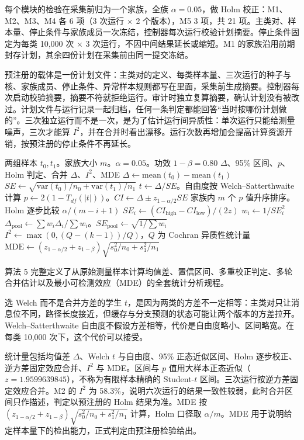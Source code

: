 每个模块的检验在采集前归为一个家族，全族 $\alpha=0.05$，做 Holm 校正：M1、M2、M3、M4 各 6 项（3 次运行 × 2 个版本），M5 3 项，共 21 项。主类对、样本量、停止条件与家族成员一次冻结，控制器每次运行校验计划摘要。停止条件固定为每类 10,000 次 × 3 次运行，不因中间结果延长或缩短。M1 的家族沿用前期封存计划，其余四份计划在采集前由同一提交冻结。

预注册的载体是一份计划文件：主类对的定义、每类样本量、三次运行的种子与核、家族成员、停止条件、异常样本规则都写在里面，采集前生成摘要。控制器每次启动校验摘要，摘要不符就拒绝运行。审计时独立复算摘要，确认计划没有被改过。计划文件与运行记录一起归档，任何一条判定都能回答“当时按哪份计划做的”。三次独立运行而不是一次，是为了估计运行间异质性：单次运行只能给测量噪声，三次才能算 $I^2$，并在合并时看出漂移。运行次数再增加会提高计算资源开销，按预注册的停止条件不再延长。

\begin{algorithm}[H]
\caption{统计判定与合并}
\label{alg:stats}
\begin{algorithmic}[1]
\Require 两组样本 $t_0,t_1$。家族大小 $m$。$\alpha=0.05$。功效 $1-\beta=0.80$
\Ensure $\Delta$、95\% 区间、$p$、Holm 判定、合并 $\Delta$、$I^2$、MDE
\State $\Delta \gets \mathrm{mean}(t_0)-\mathrm{mean}(t_1)$
\State $SE \gets \sqrt{\mathrm{var}(t_0)/n_0+\mathrm{var}(t_1)/n_1}$
\State $t \gets \Delta/SE$。自由度按 Welch--Satterthwaite 计算
\State $p \gets 2(1-T_{df}(|t|))$。$CI \gets \Delta \pm z_{1-\alpha/2}SE$
\State 家族内 $m$ 个 $p$ 值升序排序。Holm 逐步比较 $\alpha/(m-i+1)$
  \State $SE_i \gets (CI_{\mathrm{high}}-CI_{\mathrm{low}})/(2z)$
  \State $w_i \gets 1/SE_i^2$
\EndFor
\State $\Delta_{\mathrm{pool}} \gets \sum w_i\Delta_i/\sum w_i$。$SE_{\mathrm{pool}} \gets \sqrt{1/\sum w_i}$
\State $I^2 \gets \max(0,(Q-(k-1))/Q)$，$Q$ 为 Cochran 异质性统计量
\State $\mathrm{MDE} \gets (z_{1-\alpha/2}+z_{1-\beta})\sqrt{s_0^2/n_0+s_1^2/n_1}$
\end{algorithmic}
\end{algorithm}

算法 5 完整定义了从原始测量样本计算均值差、置信区间、多重校正判定、多轮合并估计以及最小可检测效应（MDE）的全套统计分析规程。

选 Welch 而不是合并方差的学生 $t$，是因为两类的方差不一定相等：主类对只让消息位不同，路径长度接近，但缓存与分支预测的状态可能让两个版本的方差拉开。Welch--Satterthwaite 自由度不假设方差相等，代价是自由度略小、区间略宽。在每类 10,000 次下，这个代价可以接受。

统计量包括均值差 $\Delta$、Welch $t$ 与自由度、95\% 正态近似区间、Holm 逐步校正、逆方差固定效应合并、$I^2$ 与 MDE。区间与 $p$ 值用大样本正态近似（$z=1.9599639845$），不称为有限样本精确的 Student-$t$ 区间。三次运行按逆方差固定效应合并。M2 的 $I^2$ 为 58.3\%，说明六次运行的结果一致性较弱，此时合并区间只作描述，判定以预注册的 Holm 结果为准。MDE 按 $(z_{1-\alpha/2}+z_{1-\beta})\sqrt{s_0^2/n_0+s_1^2/n_1}$ 计算，Holm 口径取 $\alpha/m$。MDE 用于说明给定样本量下的检出能力，正式判定由预注册检验给出。 %

